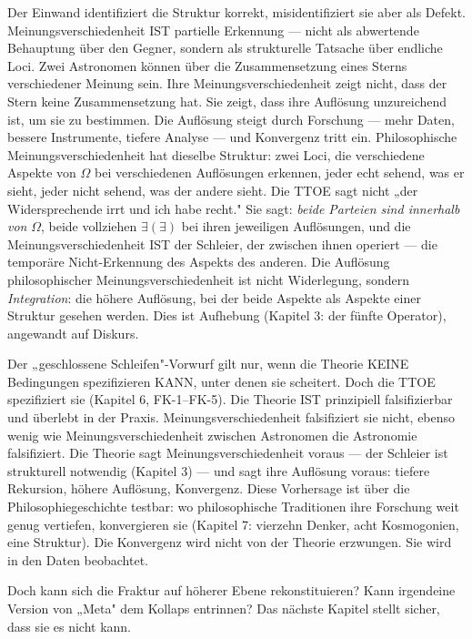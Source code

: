 \documentclass[10pt, openany, oneside]{book}
\begin{document}
Der Einwand identifiziert die Struktur korrekt, misidentifiziert sie aber als Defekt. Meinungsverschiedenheit IST partielle Erkennung --- nicht als abwertende Behauptung über den Gegner, sondern als strukturelle Tatsache über endliche Loci. Zwei Astronomen können über die Zusammensetzung eines Sterns verschiedener Meinung sein. Ihre Meinungsverschiedenheit zeigt nicht, dass der Stern keine Zusammensetzung hat. Sie zeigt, dass ihre Auflösung unzureichend ist, um sie zu bestimmen. Die Auflösung steigt durch Forschung --- mehr Daten, bessere Instrumente, tiefere Analyse --- und Konvergenz tritt ein. Philosophische Meinungsverschiedenheit hat dieselbe Struktur: zwei Loci, die verschiedene Aspekte von $\Omega$ bei verschiedenen Auflösungen erkennen, jeder echt sehend, was er sieht, jeder nicht sehend, was der andere sieht. Die TTOE sagt nicht „der Widersprechende irrt und ich habe recht." Sie sagt: \textit{beide Parteien sind innerhalb von} $\Omega$, beide vollziehen $\exists(\exists)$ bei ihren jeweiligen Auflösungen, und die Meinungsverschiedenheit IST der Schleier, der zwischen ihnen operiert --- die temporäre Nicht-Erkennung des Aspekts des anderen. Die Auflösung philosophischer Meinungsverschiedenheit ist nicht Widerlegung, sondern \textit{Integration}: die höhere Auflösung, bei der beide Aspekte als Aspekte einer Struktur gesehen werden. Dies ist Aufhebung (Kapitel 3: der fünfte Operator), angewandt auf Diskurs.

Der „geschlossene Schleifen"-Vorwurf gilt nur, wenn die Theorie KEINE Bedingungen spezifizieren KANN, unter denen sie scheitert. Doch die TTOE spezifiziert sie (Kapitel 6, FK-1--FK-5). Die Theorie IST prinzipiell falsifizierbar und überlebt in der Praxis. Meinungsverschiedenheit falsifiziert sie nicht, ebenso wenig wie Meinungsverschiedenheit zwischen Astronomen die Astronomie falsifiziert. Die Theorie sagt Meinungsverschiedenheit voraus --- der Schleier ist strukturell notwendig (Kapitel 3) --- und sagt ihre Auflösung voraus: tiefere Rekursion, höhere Auflösung, Konvergenz. Diese Vorhersage ist über die Philosophiegeschichte testbar: wo philosophische Traditionen ihre Forschung weit genug vertiefen, konvergieren sie (Kapitel 7: vierzehn Denker, acht Kosmogonien, eine Struktur). Die Konvergenz wird nicht von der Theorie erzwungen. Sie wird in den Daten beobachtet.

Doch kann sich die Fraktur auf höherer Ebene rekonstituieren? Kann irgendeine Version von „Meta" dem Kollaps entrinnen? Das nächste Kapitel stellt sicher, dass sie es nicht kann.
\end{document}
